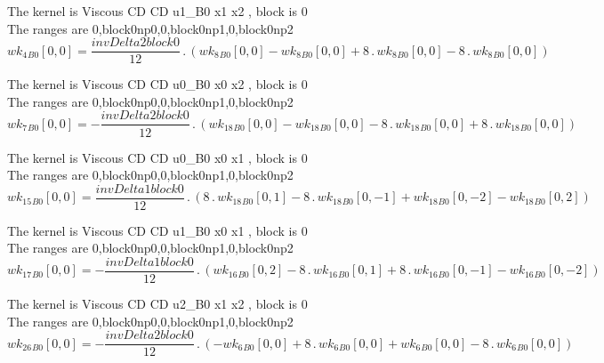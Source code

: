 \documentclass{article}
\begin{document}
\noindent The kernel is Viscous CD CD u1_B0 x1 x2 , block is 0\\\noindent The ranges are 0,block0np0,0,block0np1,0,block0np2\\\begin{dmath}{wk_{4}{_{B0}}}[{0,0}] = \frac{invDelta2block0}{12} \,.\, \left({wk_{8}{_{B0}}}[{0,0}] - {wk_{8}{_{B0}}}[{0,0}] + 8 \,.\, {wk_{8}{_{B0}}}[{0,0}] - 8 \,.\, {wk_{8}{_{B0}}}[{0,0}]\right)\end{dmath}

\noindent The kernel is Viscous CD CD u0_B0 x0 x2 , block is 0\\\noindent The ranges are 0,block0np0,0,block0np1,0,block0np2\\\begin{dmath}{wk_{7}{_{B0}}}[{0,0}] = - \frac{invDelta2block0}{12} \,.\, \left({wk_{18}{_{B0}}}[{0,0}] - {wk_{18}{_{B0}}}[{0,0}] - 8 \,.\, {wk_{18}{_{B0}}}[{0,0}] + 8 \,.\, {wk_{18}{_{B0}}}[{0,0}]\right)\end{dmath}

\noindent The kernel is Viscous CD CD u0_B0 x0 x1 , block is 0\\\noindent The ranges are 0,block0np0,0,block0np1,0,block0np2\\\begin{dmath}{wk_{15}{_{B0}}}[{0,0}] = \frac{invDelta1block0}{12} \,.\, \left(8 \,.\, {wk_{18}{_{B0}}}[{0,1}] - 8 \,.\, {wk_{18}{_{B0}}}[{0,-1}] + {wk_{18}{_{B0}}}[{0,-2}] - {wk_{18}{_{B0}}}[{0,2}]\right)\end{dmath}

\noindent The kernel is Viscous CD CD u1_B0 x0 x1 , block is 0\\\noindent The ranges are 0,block0np0,0,block0np1,0,block0np2\\\begin{dmath}{wk_{17}{_{B0}}}[{0,0}] = - \frac{invDelta1block0}{12} \,.\, \left({wk_{16}{_{B0}}}[{0,2}] - 8 \,.\, {wk_{16}{_{B0}}}[{0,1}] + 8 \,.\, {wk_{16}{_{B0}}}[{0,-1}] - {wk_{16}{_{B0}}}[{0,-2}]\right)\end{dmath}

\noindent The kernel is Viscous CD CD u2_B0 x1 x2 , block is 0\\\noindent The ranges are 0,block0np0,0,block0np1,0,block0np2\\\begin{dmath}{wk_{26}{_{B0}}}[{0,0}] = - \frac{invDelta2block0}{12} \,.\, \left(- {wk_{6}{_{B0}}}[{0,0}] + 8 \,.\, {wk_{6}{_{B0}}}[{0,0}] + {wk_{6}{_{B0}}}[{0,0}] - 8 \,.\, {wk_{6}{_{B0}}}[{0,0}]\right)\end{dmath}
\end{document}
